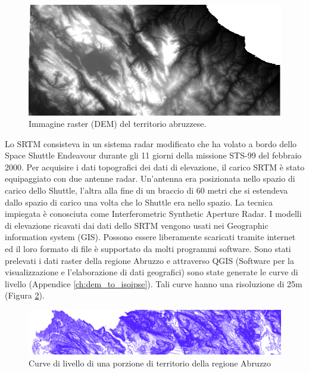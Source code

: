 \begin{figure}[h]
	\centering
	\includegraphics[width=1\textwidth]{images/STRM.PNG}
	\caption{Immagine raster (DEM) del territorio abruzzese.}
	\label{fig:raster_abruzzo}
\end{figure}

Lo SRTM consisteva in un sistema radar modificato che ha volato a bordo dello Space Shuttle Endeavour durante gli 11 giorni della missione STS-99 del febbraio 2000. Per acquisire i dati topografici dei dati di elevazione, il carico SRTM è stato equipaggiato con due antenne radar. Un'antenna era posizionata nello spazio di carico dello Shuttle, l'altra alla fine di un braccio di 60 metri che si estendeva dallo spazio di carico una volta che lo Shuttle era nello spazio. La tecnica impiegata è conosciuta come Interferometric Synthetic Aperture Radar. I modelli di elevazione ricavati dai dati dello SRTM vengono usati nei Geographic information system (GIS). Possono essere liberamente scaricati tramite internet ed il loro formato di file è supportato da molti programmi software. Sono stati prelevati i dati raster della regione Abruzzo e attraverso QGIS (Software per la visualizzazione e l'elaborazione di dati geografici) sono state generate le curve di livello (Appendice \ref{ch:dem_to_isoipse}). Tali curve hanno una risoluzione di 25m (Figura \ref{fig:curve_di_livello}).

\begin{figure}[h]
	\centering
	\includegraphics[width=1\textwidth]{images/dettaglioCurve.PNG}
	\caption{Curve di livello di una porzione di territorio della regione Abruzzo}
	\label{fig:curve_di_livello}
\end{figure}

